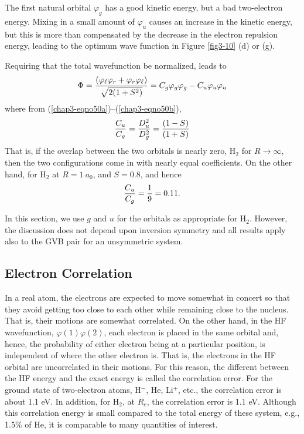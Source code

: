 The first natural orbital $\varphi_g$ has a good kinetic energy, but a bad 
two-electron energy.  Mixing in a small amount of $\varphi_u$ causes an 
increase in the kinetic energy, but this is more than compensated by the 
decrease in the electron repulsion energy, leading to the optimum 
wave function in Figure \ref{fig3-10} (d) or (g).

Requiring that the total wavefunction be normalized, leads to
\begin{equation}
\Phi = {( \varphi_\ell \varphi_r + \varphi_r \varphi_\ell ) \over
\sqrt{2(1+S^2)}} = C_g \varphi_g \varphi_g - C_u \varphi_u \varphi_u
\end{equation}
where from (\ref{chap3-eqno50a})--(\ref{chap3-eqno50b}),
\begin{equation}
{C_u \over C_g} = {D^2_u \over D^2_g} = {(1-S) \over (1+S)}
\end{equation}
That is, if the overlap between the two orbitals is nearly zero, H$_2$ 
for $R \rightarrow \infty$, then the two configurations come in with nearly 
equal coefficients.  On the other hand, for H$_2$ at $R = 1\ a_0$, and 
$S = 0.8$, and hence
\begin{equation}
{C_u \over C_g} = {1 \over 9} = 0.11.
\end{equation}

In this section, we use $g$ and $u$ for the orbitals as appropriate for 
H$_2$.  However, the discussion does not depend upon inversion symmetry 
and all results apply also to the GVB pair for an 
unsymmetric system.

\subsection{Electron Correlation}

In a real atom, the electrons are expected to move somewhat in concert so 
that they avoid getting too close to each other while remaining close to 
the nucleus.  That is, their motions are somewhat correlated.  On the other 
hand, in the HF wavefunction, $\varphi(1) \varphi(2)$, each electron is 
placed in the same orbital and, hence, the probability of either
electron being at a particular position, is independent of where the other 
electron is.  That is, the electrons in the HF orbital are 
uncorrelated in their motions.  For this reason, the different between the 
HF energy and the exact energy is called the
correlation error.  For the ground state of two-electron atoms, H$^-$, 
He, Li$^+$, etc., the correlation error is about 1.1 eV.  In addition, for 
H$_2$, at $R_e$, the correlation error is 1.1 eV.  Although this correlation 
energy is small compared to the total energy of these system, e.g., 1.5\% 
of He, it is comparable to many quantities of interest.

